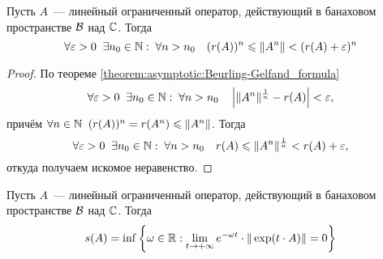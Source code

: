 \begin{corollary}
    \label{corollary:asymptotic:spectral_radius_norm_bounds}
    Пусть $ A $~--- линейный ограниченный оператор, действующий в банаховом пространстве $ \mathcal{B} $ над $ \mathbb{C} $.
    Тогда
    \[
        \forall \varepsilon > 0 \;\; \exists n_0 \in \mathbb{N}: \; \forall n > n_0 \quad (r(A))^n \leqslant \| A^n \| < (r(A) + \varepsilon)^n
    \]
\end{corollary}

\begin{proof}
    По теореме \ref{theorem:asymptotic:Beurling-Gelfand_formula}
    \[
        \forall \varepsilon > 0 \;\; \exists n_0 \in \mathbb{N}: \; \forall n > n_0 \quad \left| \| A^n \|^{\frac{1}{n}} - r(A) \right| < \varepsilon,
    \]
    причём $ \forall n \in \mathbb{N} \;\; (r(A))^n = r(A^n) \leqslant \| A^n \| $.
    Тогда
    \[
        \forall \varepsilon > 0 \;\; \exists n_0 \in \mathbb{N}: \; \forall n > n_0 \quad r(A) \leqslant \| A^n \|^{\frac{1}{n}} < r(A) + \varepsilon,
    \]
    откуда получаем искомое неравенство.
\end{proof}

\begin{lemma}
    \label{lemma:asymptotic:operator_exponential_norm_convergence}
    Пусть $ A $~--- линейный ограниченный оператор, действующий в банаховом пространстве $ \mathcal{B} $ над $ \mathbb{C} $.
    Тогда
    \[
        s(A) = \inf \left \{ \omega \in \mathbb{R}: \lim_{t \to +\infty} e^{-\omega t} \cdot \| \exp(t \cdot A) \| = 0 \right \}
    \]
\end{lemma}

